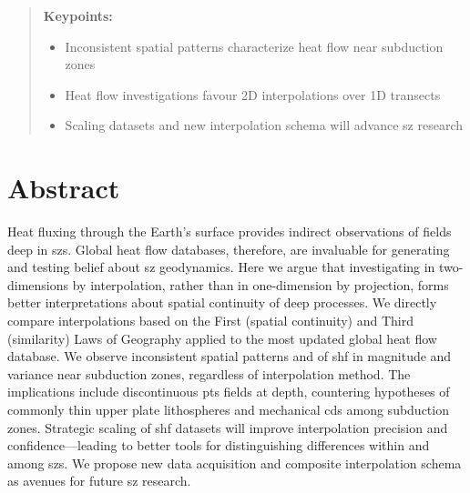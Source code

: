 \begin{quote}
\textbf{Keypoints:}

\begin{itemize}
\item
  Inconsistent spatial patterns characterize heat flow near subduction zones
\item
  Heat flow investigations favour 2D interpolations over 1D transects
\item
  Scaling datasets and new interpolation schema will advance \gls{sz} research
\end{itemize}
\end{quote}

\hypertarget{abstract-1}{%
\section{Abstract}\label{abstract-1}}

Heat fluxing through the Earth's surface provides indirect observations of  fields deep in \glspl{sz}. Global heat flow databases, therefore, are invaluable for generating and testing belief about \gls{sz} geodynamics. Here we argue that investigating  in two-dimensions by interpolation, rather than in one-dimension by projection, forms better interpretations about spatial continuity of deep processes. We directly compare interpolations based on the First (spatial continuity) and Third (similarity) Laws of Geography applied to the most updated global heat flow database. We observe inconsistent spatial patterns and of \gls{shf} in magnitude and variance near subduction zones, regardless of interpolation method. The implications include discontinuous \gls{pts} fields at depth, countering hypotheses of commonly thin upper plate lithospheres and mechanical \glspl{cd} among subduction zones. Strategic scaling of \gls{shf} datasets will improve interpolation precision and confidence---leading to better tools for distinguishing differences within and among \glspl{sz}. We propose new data acquisition and composite interpolation schema as avenues for future \gls{sz} research.

\cleardoublepage

\hypertarget{refs}{}
\begin{CSLReferences}{0}{0}
\end{CSLReferences}


\renewcommand\bibname{REFERENCES}
\cleardoublepage
{}




